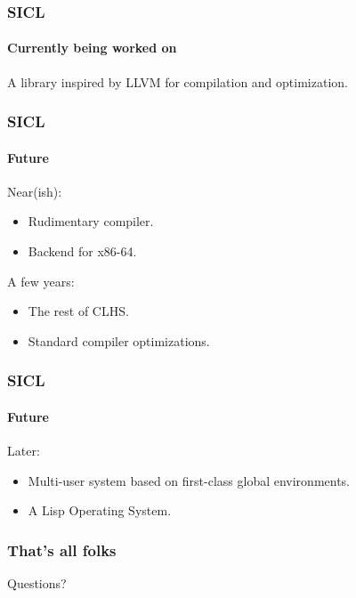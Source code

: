 \documentclass{beamer}
\begin{document}
\begin{frame}
  \frametitle{SICL}
  \framesubtitle{Currently being worked on}

A library inspired by LLVM for compilation and optimization. 

\end{frame}
\begin{frame}
  \frametitle{SICL}
  \framesubtitle{Future}

Near(ish):
\begin{itemize}
\item Rudimentary compiler.
\item Backend for x86-64.
\end{itemize}
\vskip 0.5cm
  
A few years:
\begin{itemize}
\item The rest of CLHS.
\item Standard compiler optimizations.
\end{itemize}

\end{frame}
\begin{frame}
  \frametitle{SICL}
  \framesubtitle{Future}
Later:
\begin{itemize}
\item Multi-user system based on first-class global environments. 
\item A Lisp Operating System.
\end{itemize}
\end{frame}
\begin{frame}
  \frametitle{That's all folks}
  
Questions?

\end{frame}
\end{document}
